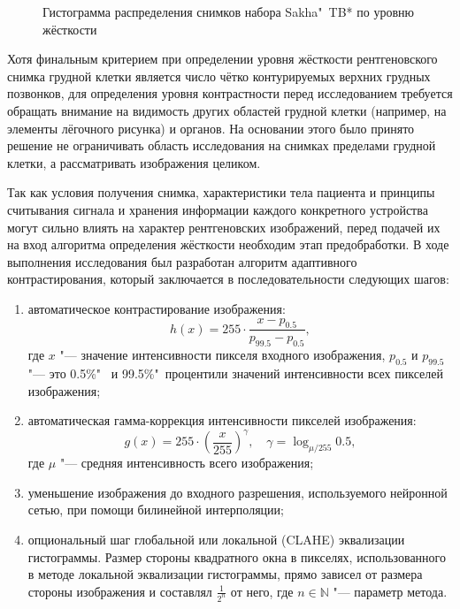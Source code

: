 \begin{figure}[ht]
	\caption{Гистограмма распределения снимков набора Sakha"~TB* по уровню жёсткости}
	\label{fig:synopsis-hardness-yak-hardness}
\end{figure}

Хотя финальным критерием при определении уровня жёсткости рентгеновского снимка грудной клетки является число чётко контурируемых верхних грудных позвонков,
для определения уровня контрастности перед исследованием требуется обращать внимание на видимость других областей грудной клетки (например, на элементы лёгочного рисунка) и органов.
На основании этого было принято решение не ограничивать область исследования на снимках пределами грудной клетки, а рассматривать изображения целиком.

Так как условия получения снимка, характеристики тела пациента и принципы считывания сигнала и хранения информации каждого конкретного устройства могут сильно влиять на характер рентгеновских изображений, перед подачей их на вход алгоритма определения жёсткости необходим этап предобработки. В ходе выполнения исследования был разработан алгоритм адаптивного контрастирования, который заключается в последовательности следующих шагов:
\begin{enumerate}[beginpenalty=10000]
	\item автоматическое контрастирование изображения:
	\begin{equation}
		h \left( x \right) = 255 \cdot \frac{x - p_{0.5}}{p_{99.5} - p_{0.5}}, \nonumber
	\end{equation}
	где $x$ "--- значение интенсивности пикселя входного изображения, $p_{0.5}$ и $p_{99.5}$ "--- это 0.5\%"~ и 99.5\%"~процентили значений интенсивности всех пикселей изображения;
	\item автоматическая гамма-коррекция интенсивности пикселей изображения:
	\begin{equation}
		g \left( x \right) = 255 \cdot {\left( \frac{x}{255} \right)}^{\gamma}, \quad \gamma = \log_{\mu / 255}{0.5}, \nonumber
	\end{equation}
	где $\mu$ "--- средняя интенсивность всего изображения;
	\item уменьшение изображения до входного разрешения, используемого нейронной сетью, при помощи билинейной интерполяции;
	\item опциональный шаг глобальной или локальной (CLAHE) эквализации гистограммы. Размер стороны квадратного окна  в пикселях, использованного в методе локальной эквализации гистограммы, прямо зависел от размера стороны изображения и составлял $\frac{1}{2^n}$ от него, где $n\in\mathbb{N}$ "--- параметр метода.
\end{enumerate}

